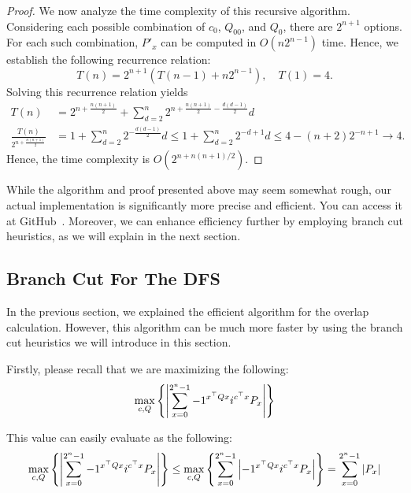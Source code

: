 \documentclass[a4paper, onecolumn, 11pt, longbibliography]{quantumarticle}
\begin{document}
\begin{proof}
  We now analyze the time complexity of this recursive algorithm.
  Considering each possible combination of $c_0$, $Q_{00}$, and $Q_0$, there are $2^{n+1}$ options. For each such combination, $P'_x$ can be computed in $O(n2^{n-1})$ time. Hence, we establish the following recurrence relation:
  \begin{equation*}
    T(n) = 2^{n+1} (T(n-1)+n2^{n-1}), \quad T(1) = 4.
  \end{equation*}
  Solving this recurrence relation yields
  \begin{align*}
    T(n)                                & = 2^{n+\frac{n(n+1)}{2}}+ \sum_{d=2}^{n} 2^{n+\frac{n(n+1)}{2}-\frac{d(d-1)}{2}}d \\
    \frac{T(n)}{2^{n+\frac{n(n+1)}{2}}} & = 1 + \sum_{d=2}^{n} 2^{-\frac{d(d-1)}{2}} d
    \leq 1 + \sum_{d=2}^{n} 2^{-d+1} d
    \leq 4-(n+2)2^{-n+1} \to 4.
  \end{align*}
  Hence, the time complexity is $O(2^{n+n(n+1)/2})$.
\end{proof}
While the algorithm and proof presented above may seem somewhat rough, our actual implementation is significantly more precise and efficient. You can access it at GitHub~\cite{Hamaguchi_stabilizer_extent_2024}.
Moreover, we can enhance efficiency further by employing branch cut heuristics, as we will explain in the next section.

\subsection{Branch Cut For The DFS}

In the previous section, we explained the efficient algorithm for the overlap calculation.
However, this algorithm can be much more faster
by using the branch cut heuristics we will introduce in this section.

Firstly, please recall that we are maximizing the following:
\begin{equation*}
  \max_{c,Q} \qty{ \abs{\sum_{x=0}^{2^n-1} -1^{x^\top Q x} i^{c^\top x} P_x} }
\end{equation*}

This value can easily evaluate as the following:
\begin{equation*}
  \max_{c,Q} \qty{ \abs{\sum_{x=0}^{2^n-1} -1^{x^\top Q x} i^{c^\top x} P_x} }
  \leq \max_{c,Q} \qty{ \sum_{x=0}^{2^n-1} \abs{-1^{x^\top Q x} i^{c^\top x} P_x} }
  = \sum_{x=0}^{2^n-1} \abs{P_x}
\end{equation*}
\end{document}
